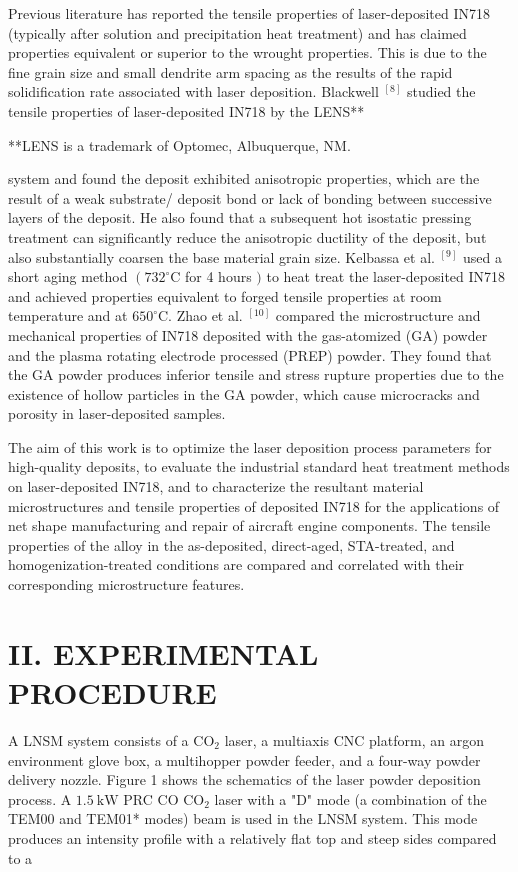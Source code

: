 \documentclass[10pt]{article}
\begin{document}
Previous literature has reported the tensile properties of laser-deposited IN718 (typically after solution and precipitation heat treatment) and has claimed properties equivalent or superior to the wrought properties. This is due to the fine grain size and small dendrite arm spacing as the results of the rapid solidification rate associated with laser deposition. Blackwell ${ }^{[8]}$ studied the tensile properties of laser-deposited IN718 by the LENS**

**LENS is a trademark of Optomec, Albuquerque, NM.

system and found the deposit exhibited anisotropic properties, which are the result of a weak substrate/ deposit bond or lack of bonding between successive layers of the deposit. He also found that a subsequent hot isostatic pressing treatment can significantly reduce the anisotropic ductility of the deposit, but also substantially coarsen the base material grain size. Kelbassa et al. ${ }^{[9]}$ used a short aging method $\left(732^{\circ} \mathrm{C}\right.$ for 4 hours $)$ to heat treat the laser-deposited IN718 and achieved properties equivalent to forged tensile properties at room temperature and at $650^{\circ} \mathrm{C}$. Zhao et al. ${ }^{[10]}$ compared the microstructure and mechanical properties of IN718 deposited with the gas-atomized (GA) powder and the plasma rotating electrode processed (PREP) powder. They found that the GA powder produces inferior tensile and stress rupture properties due to the existence of hollow particles in the GA powder, which cause microcracks and porosity in laser-deposited samples.

The aim of this work is to optimize the laser deposition process parameters for high-quality deposits, to evaluate the industrial standard heat treatment methods on laser-deposited IN718, and to characterize the resultant material microstructures and tensile properties of deposited IN718 for the applications of net shape manufacturing and repair of aircraft engine components. The tensile properties of the alloy in the as-deposited, direct-aged, STA-treated, and homogenization-treated conditions are compared and correlated with their corresponding microstructure features.

\section*{II. EXPERIMENTAL PROCEDURE}
A LNSM system consists of a $\mathrm{CO}_{2}$ laser, a multiaxis CNC platform, an argon environment glove box, a multihopper powder feeder, and a four-way powder delivery nozzle. Figure 1 shows the schematics of the laser powder deposition process. A $1.5 \mathrm{~kW}$ PRC CO $\mathrm{CO}_{2}$ laser with a "D" mode (a combination of the TEM00 and TEM01* modes) beam is used in the LNSM system. This mode produces an intensity profile with a relatively flat top and steep sides compared to a
\end{document}
